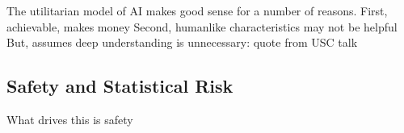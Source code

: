 The utilitarian model of AI makes good sense for a number of reasons.
First, achievable, makes money
Second, humanlike characteristics may not be helpful
But, assumes deep understanding is unnecessary: quote from USC talk


\subsection{Safety and Statistical Risk}
What drives this is safety


